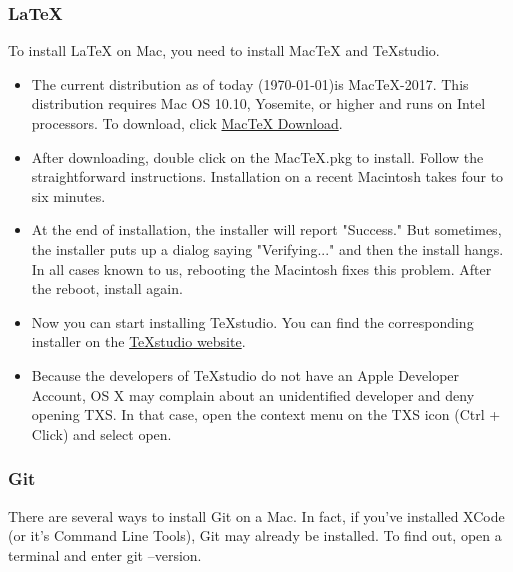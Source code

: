 \documentclass[11pt]{article} %
\begin{document}
    \subsubsection{LaTeX}
      To install LaTeX on Mac, you need to install MacTeX and TeXstudio. 
      \begin{itemize}
      	\item The current distribution as of today (\today)is MacTeX-2017. 
        This distribution requires Mac OS 10.10, Yosemite, or higher and runs on Intel processors. 
        To download, click \href{http://www.tug.org/mactex/mactex-download.html}{MacTeX Download}. 
      	\item After downloading, double click on the MacTeX.pkg to install. 
        Follow the straightforward instructions. 
        Installation on a recent Macintosh takes four to six minutes. 
      	\item At the end of installation, the installer will report "Success." But sometimes, the installer puts up a dialog saying "Verifying..." and then the install hangs. 
        In all cases known to us, rebooting the Macintosh fixes this problem. 
        After the reboot, install again. 
      	\item Now you can start installing TeXstudio. 
        You can find the corresponding installer on the \href{https://www.texstudio.org/}{TeXstudio website}. 
      	\item Because the developers of TeXstudio do not have an Apple Developer Account, OS X may complain about an unidentified developer and deny opening TXS. 
        In that case, open the context menu on the TXS icon (Ctrl + Click) and select open. 
      \end{itemize} 
    
    \subsubsection{Git}
      There are several ways to install Git on a Mac. 
      In fact, if you've installed XCode (or it's Command Line Tools), Git may already be installed. 
      To find out, open a terminal and enter git --version. 
      
\end{document}
